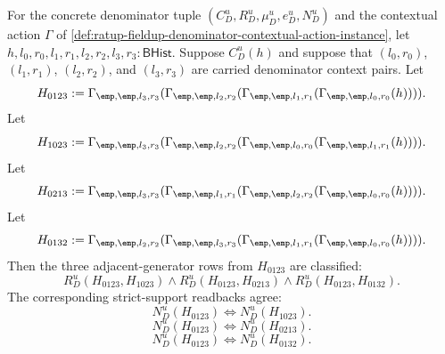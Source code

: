 \begin{theorem}
\label{thm:ratup-fieldup-four-context-pair-adjacent-swap-coverage}
For the concrete denominator tuple
$(C_D^u,R_D^u,\mu_D^u,e_D^u,N_D^u)$ and the contextual action $\Gamma$ of
\autoref{def:ratup-fieldup-denominator-contextual-action-instance}, let
$h,l_0,r_0,l_1,r_1,l_2,r_2,l_3,r_3:\mathsf{BHist}$. Suppose $C_D^u(h)$ and
suppose that $(l_0,r_0)$, $(l_1,r_1)$, $(l_2,r_2)$, and $(l_3,r_3)$ are
carried denominator context pairs. Let
$$
H_{0123}:=
\Gamma_{\emp,\emp,l_3,r_3}
(\Gamma_{\emp,\emp,l_2,r_2}
(\Gamma_{\emp,\emp,l_1,r_1}
(\Gamma_{\emp,\emp,l_0,r_0}(h)))).
$$
Let
$$
H_{1023}:=
\Gamma_{\emp,\emp,l_3,r_3}
(\Gamma_{\emp,\emp,l_2,r_2}
(\Gamma_{\emp,\emp,l_0,r_0}
(\Gamma_{\emp,\emp,l_1,r_1}(h)))).
$$
Let
$$
H_{0213}:=
\Gamma_{\emp,\emp,l_3,r_3}
(\Gamma_{\emp,\emp,l_1,r_1}
(\Gamma_{\emp,\emp,l_2,r_2}
(\Gamma_{\emp,\emp,l_0,r_0}(h)))).
$$
Let
$$
H_{0132}:=
\Gamma_{\emp,\emp,l_2,r_2}
(\Gamma_{\emp,\emp,l_3,r_3}
(\Gamma_{\emp,\emp,l_1,r_1}
(\Gamma_{\emp,\emp,l_0,r_0}(h)))).
$$
Then the three adjacent-generator rows from $H_{0123}$ are classified:
$$
R_D^u(H_{0123},H_{1023})
\land
R_D^u(H_{0123},H_{0213})
\land
R_D^u(H_{0123},H_{0132}).
$$
The corresponding strict-support readbacks agree:
$$
N_D^u(H_{0123})
\Longleftrightarrow
N_D^u(H_{1023}).
$$
$$
N_D^u(H_{0123})
\Longleftrightarrow
N_D^u(H_{0213}).
$$
$$
N_D^u(H_{0123})
\Longleftrightarrow
N_D^u(H_{0132}).
$$
\end{theorem}
